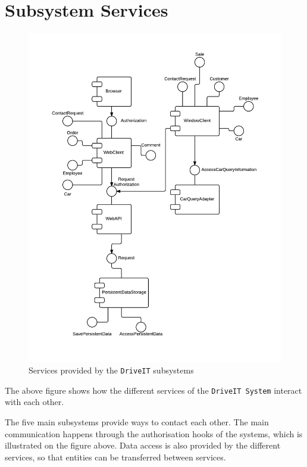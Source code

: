 \chapter{Subsystem Services}
\begin{figure}[H]
	\centering
	\includegraphics[width=\textwidth]{Figures/SubsystemServices}
	\caption{Services provided by the \texttt{DriveIT} subsystems}
	\label{fig:subsystemservices}
\end{figure}

The above figure shows how the different services of the \texttt{DriveIT System} interact with each other.

The five main subsystems provide ways to contact each other. The main communication happens through the authorisation hooks of the systems, which is illustrated on the figure above.
Data access is also provided by the different services, so that entities can be transferred between services.
